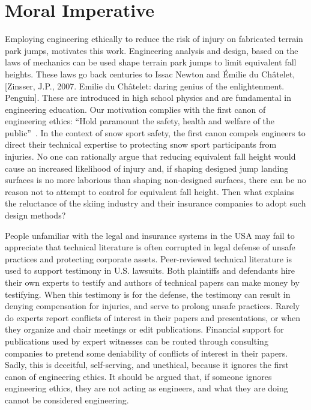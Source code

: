 \documentclass{article}
\begin{document}
\section{Moral Imperative}
%
Employing engineering ethically to reduce the risk of injury on fabricated terrain park jumps, motivates this work. Engineering analysis and design, based on the laws of mechanics can be used shape terrain park jumps to limit equivalent fall heights. These laws go back centuries to Issac Newton and Émilie du Châtelet, [Zinsser, J.P., 2007. Emilie du Châtelet: daring genius of the enlightenment. Penguin]. These are introduced in high school physics and are fundamental in engineering education. Our motivation complies with the first canon of engineering ethics: ``Hold paramount the safety, health and
welfare of the public''~\cite{NSPE2019}. In the context of snow sport safety,
the first canon compels engineers to direct their technical expertise to
protecting snow sport participants from injuries. No one can rationally argue
that reducing equivalent fall height would cause an increased likelihood of injury
and, if shaping designed jump landing surfaces is no more laborious than shaping
non-designed surfaces, there can be no reason not to attempt to control for
equivalent fall height. Then what explains the reluctance of the skiing industry and their insurance companies 
to adopt such design methods?

People unfamiliar with the legal and insurance systems in the USA
may fail to appreciate that technical literature is often corrupted in legal 
defense of unsafe practices and protecting corporate assets. Peer-reviewed technical
literature is used to support testimony in U.S. lawsuits. Both plaintiffs and
defendants hire their own experts to testify and authors of technical papers
can make money by testifying. When this testimony is for the defense, the testimony can
result in denying compensation for injuries, and serve to prolong unsafe
practices. Rarely do experts report conflicts of interest in
their papers and presentations, or when they organize and chair meetings or
edit publications. Financial support for publications used by expert witnesses
can be routed through consulting companies to pretend some deniability of
conflicts of interest in their papers. Sadly, this is deceitful, self-serving, and unethical, because it ignores the first canon of engineering ethics. It should be argued that, if someone ignores engineering ethics, they are not acting as engineers, and what they are doing cannot be considered engineering.
\end{document}
